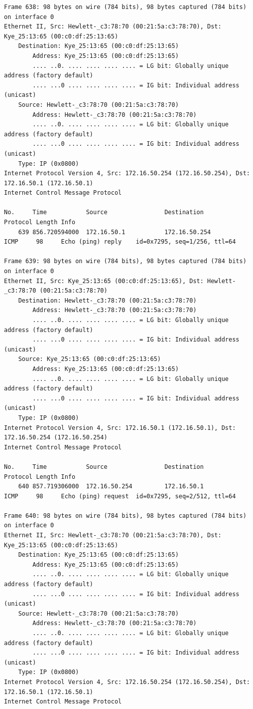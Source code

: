 \documentclass[a4paper,11pt]{article}
\begin{document}
\begin{lstlisting}
Frame 638: 98 bytes on wire (784 bits), 98 bytes captured (784 bits) on interface 0
Ethernet II, Src: Hewlett-_c3:78:70 (00:21:5a:c3:78:70), Dst: Kye_25:13:65 (00:c0:df:25:13:65)
    Destination: Kye_25:13:65 (00:c0:df:25:13:65)
        Address: Kye_25:13:65 (00:c0:df:25:13:65)
        .... ..0. .... .... .... .... = LG bit: Globally unique address (factory default)
        .... ...0 .... .... .... .... = IG bit: Individual address (unicast)
    Source: Hewlett-_c3:78:70 (00:21:5a:c3:78:70)
        Address: Hewlett-_c3:78:70 (00:21:5a:c3:78:70)
        .... ..0. .... .... .... .... = LG bit: Globally unique address (factory default)
        .... ...0 .... .... .... .... = IG bit: Individual address (unicast)
    Type: IP (0x0800)
Internet Protocol Version 4, Src: 172.16.50.254 (172.16.50.254), Dst: 172.16.50.1 (172.16.50.1)
Internet Control Message Protocol

No.     Time           Source                Destination           Protocol Length Info
    639 856.720594000  172.16.50.1           172.16.50.254         ICMP     98     Echo (ping) reply    id=0x7295, seq=1/256, ttl=64

Frame 639: 98 bytes on wire (784 bits), 98 bytes captured (784 bits) on interface 0
Ethernet II, Src: Kye_25:13:65 (00:c0:df:25:13:65), Dst: Hewlett-_c3:78:70 (00:21:5a:c3:78:70)
    Destination: Hewlett-_c3:78:70 (00:21:5a:c3:78:70)
        Address: Hewlett-_c3:78:70 (00:21:5a:c3:78:70)
        .... ..0. .... .... .... .... = LG bit: Globally unique address (factory default)
        .... ...0 .... .... .... .... = IG bit: Individual address (unicast)
    Source: Kye_25:13:65 (00:c0:df:25:13:65)
        Address: Kye_25:13:65 (00:c0:df:25:13:65)
        .... ..0. .... .... .... .... = LG bit: Globally unique address (factory default)
        .... ...0 .... .... .... .... = IG bit: Individual address (unicast)
    Type: IP (0x0800)
Internet Protocol Version 4, Src: 172.16.50.1 (172.16.50.1), Dst: 172.16.50.254 (172.16.50.254)
Internet Control Message Protocol

No.     Time           Source                Destination           Protocol Length Info
    640 857.719306000  172.16.50.254         172.16.50.1           ICMP     98     Echo (ping) request  id=0x7295, seq=2/512, ttl=64

Frame 640: 98 bytes on wire (784 bits), 98 bytes captured (784 bits) on interface 0
Ethernet II, Src: Hewlett-_c3:78:70 (00:21:5a:c3:78:70), Dst: Kye_25:13:65 (00:c0:df:25:13:65)
    Destination: Kye_25:13:65 (00:c0:df:25:13:65)
        Address: Kye_25:13:65 (00:c0:df:25:13:65)
        .... ..0. .... .... .... .... = LG bit: Globally unique address (factory default)
        .... ...0 .... .... .... .... = IG bit: Individual address (unicast)
    Source: Hewlett-_c3:78:70 (00:21:5a:c3:78:70)
        Address: Hewlett-_c3:78:70 (00:21:5a:c3:78:70)
        .... ..0. .... .... .... .... = LG bit: Globally unique address (factory default)
        .... ...0 .... .... .... .... = IG bit: Individual address (unicast)
    Type: IP (0x0800)
Internet Protocol Version 4, Src: 172.16.50.254 (172.16.50.254), Dst: 172.16.50.1 (172.16.50.1)
Internet Control Message Protocol


\end{lstlisting}
\end{document}
